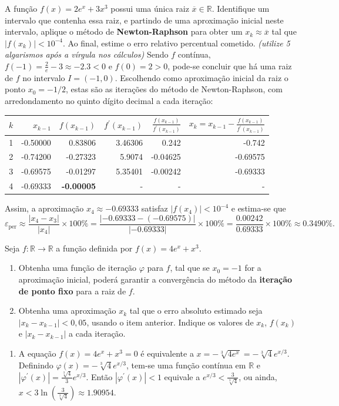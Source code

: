 \documentclass[12pt,a4paper]{article}
\newcommand*\R{\mathbb{R}}
\begin{document}
\begin{ExerciseList}
\Exercise[title={2,5}]
A função $f(x) = 2 e^x + 3x^3$ possui uma única raiz $\overline{x} \in \R$. Identifique um intervalo que contenha essa raiz, e partindo de uma aproximação inicial neste intervalo, aplique o método de \textbf{Newton-Raphson} para obter um $x_k \approx \overline{x}$ tal que $|f(x_k)| < 10^{-4}$. Ao final, estime o erro relativo percentual cometido. \textit{(utilize 5 algarismos após a vírgula nos cálculos)}
\Answer 
Sendo $f$ contínua, $f(-1) = \frac{2}{e} - 3 \approx -2.3 < 0$ e $f(0) = 2 > 0$, pode-se concluir que há uma raiz de $f$ no intervalo $I = (-1, 0)$. Escolhendo como aproximação inicial da raiz o ponto $x_0 = -1/2$, estas são as iterações do método de Newton-Raphson, com arredondamento no quinto dígito decimal a cada iteração:

\begin{center}
\begin{tabular}{|r|r|r|r|r|r|}
\hline
$k$ &  $x_{k-1}$ & $f(x_{k-1})$ & $f^\prime(x_{k-1})$ & $\frac{f(x_{k-1})}{f^\prime(x_{k-1})}$ & $x_k = x_{k-1} - \frac{f(x_{k-1})}{f^\prime(x_{k-1})}$ \\
\hline
1 & -0.50000 & 0.83806 & 3.46306 & 0.242 & -0.742 \\
\hline
2 & -0.74200 & -0.27323 & 5.9074 & -0.04625 & -0.69575 \\
\hline
3 & -0.69575 & -0.01297 & 5.35401 & -0.00242 &-0.69333 \\
\hline
4 & -0.69333 & \textbf{-0.00005} & - & - & - \\
\hline
\end{tabular}
\end{center}
\medskip
Assim, a aproximação $x_4 \approx -0.69333$ satisfaz $| f(x_4) | < 10^{-4}$ e estima-se que
\[
\varepsilon_{\text{per}}
\approx
\frac{|x_4 - x_3|}{|x_4|} \times 100\%
= \frac{|-0.69333 - (-0.69575)|}{|-0.69333|} \times 100\%
= \frac{0.00242}{0.69333} \times 100\%
\approx 0.3490\%.
\]

\Exercise[title={2,5}]
Seja $f: \R \to \R$ a função definida por $f(x) = 4e^x + x^3$.
\begin{enumerate}
\item Obtenha uma função de iteração $\varphi$ para $f$, tal que se
$x_0 = -1$ for a aproximação inicial, poderá garantir a convergência do método da \textbf{iteração de ponto fixo} para a raiz de $f$.
\item Obtenha uma aproximação $x_k$ tal que o erro absoluto estimado seja $|x_k - x_{k-1}| < 0,05$, usando o item anterior. Indique os valores de $x_k$, $f(x_k)$ e $|x_k - x_{k-1}|$ a cada iteração.
\end{enumerate}
\Answer
\begin{enumerate}
\item A equação $f(x) = 4e^x + x^3 = 0$ é equivalente a
$x = -\sqrt[3]{4e^x} = -\sqrt[3]{4}e^{x/3}$. Definindo $\varphi(x) = -\sqrt[3]{4}e^{x/3}$, tem-se uma função contínua em $\R$ e $|\varphi^\prime(x)| = \frac{\sqrt[3]{4}}{3}e^{x/3}$. Então $|\varphi^\prime(x)| < 1$ equivale a
$e^{x/3} < \frac{3}{\sqrt[3]{4}}$,
ou ainda,
$x < 3 \ln\left( \frac{3}{\sqrt[3]{4}} \right) \approx 1.90954$.


\end{enumerate}
\end{ExerciseList}
\end{document}
